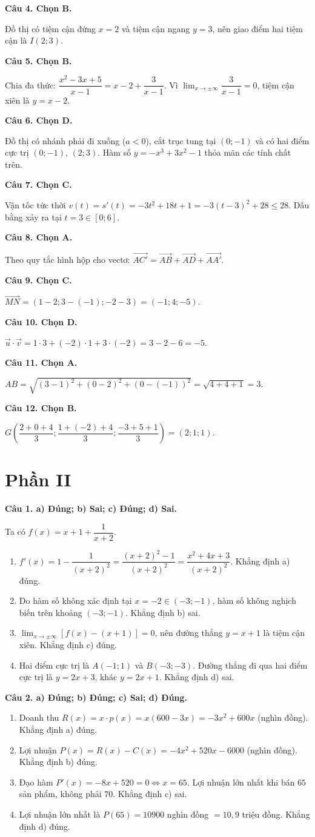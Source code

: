 \documentclass[12pt,a4paper]{article}
\newcommand{\loigiai}[1]{\par\medskip\Needspace{4\baselineskip}\noindent\textbf{#1}\par\nobreak}
\begin{document}
\loigiai{Câu 4. Chọn B.}
Đồ thị có tiệm cận đứng $x=2$ và tiệm cận ngang $y=3$, nên giao điểm hai tiệm cận là $I(2;3)$.

\loigiai{Câu 5. Chọn B.}
Chia đa thức: $\dfrac{x^2-3x+5}{x-1}=x-2+\dfrac{3}{x-1}$. Vì $\lim_{x\to\pm\infty}\dfrac{3}{x-1}=0$, tiệm cận xiên là $y=x-2$.

\loigiai{Câu 6. Chọn D.}
Đồ thị có nhánh phải đi xuống ($a<0$), cắt trục tung tại $(0;-1)$ và có hai điểm cực trị $(0;-1)$, $(2;3)$. Hàm số $y=-x^3+3x^2-1$ thỏa mãn các tính chất trên.

\loigiai{Câu 7. Chọn C.}
Vận tốc tức thời $v(t)=s'(t)=-3t^2+18t+1=-3(t-3)^2+28\le28$. Dấu bằng xảy ra tại $t=3\in[0;6]$.

\loigiai{Câu 8. Chọn A.}
Theo quy tắc hình hộp cho vectơ: $\overrightarrow{AC'}=\overrightarrow{AB}+\overrightarrow{AD}+\overrightarrow{AA'}$.

\loigiai{Câu 9. Chọn C.}
$\overrightarrow{MN}=(1-2;3-(-1);-2-3)=(-1;4;-5)$.

\loigiai{Câu 10. Chọn D.}
$\vec u\cdot\vec v=1\cdot3+(-2)\cdot1+3\cdot(-2)=3-2-6=-5$.

\loigiai{Câu 11. Chọn A.}
$AB=\sqrt{(3-1)^2+(0-2)^2+(0-(-1))^2}=\sqrt{4+4+1}=3$.

\loigiai{Câu 12. Chọn B.}
$G\left(\dfrac{2+0+4}3;\dfrac{1+(-2)+4}3;\dfrac{-3+5+1}3\right)=(2;1;1)$.

\newpage
\section*{\large Phần II}
\loigiai{Câu 1. a) Đúng; b) Sai; c) Đúng; d) Sai.}
Ta có $f(x)=x+1+\dfrac1{x+2}$.
\begin{enumerate}[label=\alph*),leftmargin=*,itemsep=2pt]
\item $f'(x)=1-\dfrac1{(x+2)^2}=\dfrac{(x+2)^2-1}{(x+2)^2}=\dfrac{x^2+4x+3}{(x+2)^2}$. Khẳng định a) đúng.
\item Do hàm số không xác định tại $x=-2\in(-3;-1)$, hàm số không nghịch biến trên khoảng $(-3;-1)$. Khẳng định b) sai.
\item $\lim_{x\to\pm\infty}[f(x)-(x+1)]=0$, nên đường thẳng $y=x+1$ là tiệm cận xiên. Khẳng định c) đúng.
\item Hai điểm cực trị là $A(-1;1)$ và $B(-3;-3)$. Đường thẳng đi qua hai điểm cực trị là $y=2x+3$, khác $y=2x+1$. Khẳng định d) sai.
\end{enumerate}

\loigiai{Câu 2. a) Đúng; b) Đúng; c) Sai; d) Đúng.}
\begin{enumerate}[label=\alph*),leftmargin=*,itemsep=2pt]
\item Doanh thu $R(x)=x\cdot p(x)=x(600-3x)=-3x^2+600x$ (nghìn đồng). Khẳng định a) đúng.
\item Lợi nhuận $P(x)=R(x)-C(x)=-4x^2+520x-6000$ (nghìn đồng). Khẳng định b) đúng.
\item Đạo hàm $P'(x)=-8x+520=0\Leftrightarrow x=65$. Lợi nhuận lớn nhất khi bán $65$ sản phẩm, không phải $70$. Khẳng định c) sai.
\item Lợi nhuận lớn nhất là $P(65)=10900$ nghìn đồng $=10{,}9$ triệu đồng. Khẳng định d) đúng.
\end{enumerate}
\end{document}
